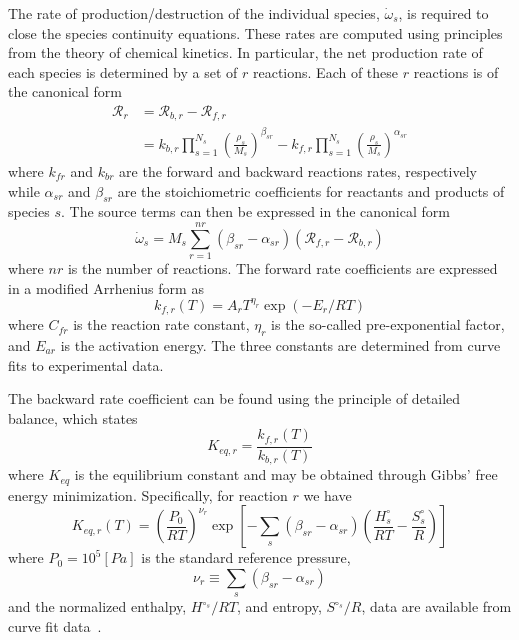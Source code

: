 The rate of production/destruction of the individual species,
$\dot{\omega}_s$, is required to close the species continuity
equations.  These rates are computed using principles from the theory
of chemical kinetics. In particular, the net production rate of each
species is determined by a set of $r$ reactions.
Each of these $r$ reactions is of the canonical form
\begin{align}
  \mathcal{R}_r &= \mathcal{R}_{b,r} - \mathcal{R}_{f,r} \\ &= k_{b,r}
  \prod_{s=1}^{N_s} \left(\frac{\rho_s}{M_s}\right)^{\beta_{sr}} -
  k_{f,r} \prod_{s=1}^{N_s}
  \left(\frac{\rho_s}{M_s}\right)^{\alpha_{sr}}
\end{align}
where $k_{fr}$ and $k_{br}$ are the forward and backward reactions
rates, respectively while $\alpha_{sr}$ and $\beta_{sr}$ are the
stoichiometric coefficients for reactants and products of species $s$.
The source terms can then be expressed in the canonical form
%
\begin{equation}
  \dot{\omega}_s = M_s \sum_{r=1}^{nr}\left(\beta_{sr}-\alpha_{sr}\right)\left(\mathcal{R}_{f,r} - \mathcal{R}_{b,r}\right)
\end{equation}
%
where $nr$ is the number of reactions.
The forward rate coefficients are expressed in a modified Arrhenius form as
%
\begin{equation}\label{eq:arrhenius}
  k_{f,r}\left(T\right) = A_{r} T^{\eta_r} \exp \left(-E_{r}/RT\right)
\end{equation}
%
where
$C_{fr}$ is the reaction rate constant, $\eta_r$ is the so-called pre-exponential factor, and $E_{ar}$ is the activation energy.
The three constants are determined from curve fits to experimental data.

%
The backward rate coefficient can be found using the principle of detailed balance, which states
\begin{equation}
  \label{eq:k_br}
  K_{eq,r} = \frac{k_{f,r}\left(T\right)}{k_{b,r}\left(T\right)}
\end{equation}
%
where $K_{eq}$ is the equilibrium constant and may be obtained through Gibbs' free energy minimization. Specifically, for reaction $r$ we have
%
\begin{equation}
  \label{eq:k_eq}
  K_{eq,r}\left(T\right) =
  \left(\frac{P_0}{RT}\right)^{\nu_r}\exp\left[-\sum_s\left(\beta_{sr}-\alpha_{sr}\right)\left(\frac{H^\circ_s}{RT} - \frac{S^\circ_s}{R}\right)\right]
\end{equation}
%
where $P_0= 10^5 [Pa]$ is the standard reference pressure,
%
\begin{equation}
  \nu_r \equiv \sum_s\left(\beta_{sr}-\alpha_{sr}\right)
\end{equation}
%
and the normalized enthalpy, $H^{\circ_s}/RT$, and entropy, $S^{\circ_s}/R$, data are available from curve fit data~\cite{CEATables}.

